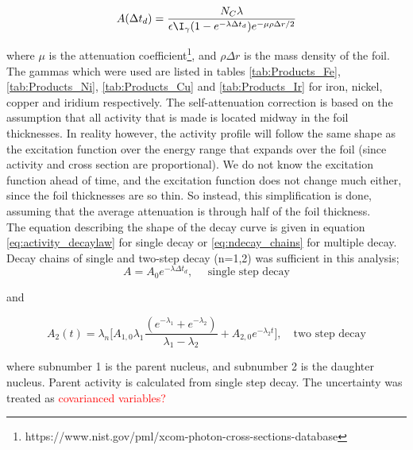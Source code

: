\documentclass[a4paper,11pt,twoside]{book}
\begin{document}
\begin{equation}
    A(\Delta t_d) = \frac{N_C\lambda}{\epsilon\I_\gamma (1-e^{-\lambda \Delta t_d})e^{-\mu\rho\Delta r/2}}
\end{equation}

where $\mu$ is the attenuation coefficient\footnote{https://www.nist.gov/pml/xcom-photon-cross-sections-database}, and $\rho\Delta r$ is the mass density of the foil. The gammas which were used are listed in tables \ref{tab:Products_Fe}, \ref{tab:Products_Ni}, \ref{tab:Products_Cu} and \ref{tab:Products_Ir} for iron, nickel, copper and iridium respectively. The self-attenuation correction is based on the assumption that all activity that is made is located midway in the foil thicknesses. In reality however, the activity profile will follow the same shape as the excitation function over the energy range that expands over the foil (since activity and cross section are proportional). We do not know the excitation function ahead of time, and the excitation function does not change much either, since the foil thicknesses are so thin. So instead, this simplification is done, assuming that the average attenuation is through half of the foil thickness. \\ 

\noindent 
The equation describing the shape of the decay curve is given in equation \ref{eq:activity_decaylaw} for single decay or \ref{eq:ndecay_chains} for multiple decay. Decay chains of single and two-step decay (n=1,2) was sufficient in this analysis; 
\begin{equation} \label{eq:onestep_activity}
    A = A_0 e^{-\lambda \Delta t_d},\quad \text{ single step decay}
\end{equation}

and

\begin{equation} \label{eq:twostep_activity}
    A_2(t) = \lambda_n \Big[ A_{1,0}\lambda_1 \frac{(e^{-\lambda_1 } + e^{-\lambda_2})}{\lambda_1 - \lambda _2} + A_{2,0}e^{-\lambda_2 t} \Big],\quad \text{two step decay}
\end{equation}

where subnumber 1 is the parent nucleus, and subnumber 2 is the daughter nucleus. Parent activity is calculated from single step decay. The uncertainty was treated as \textcolor{red}{covarianced variables?} \\
\end{document}
